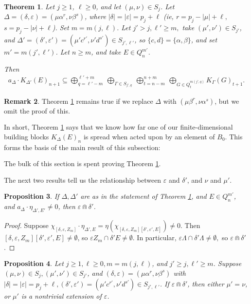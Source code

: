 \documentclass[12pt]{amsart}
\newcommand{\sse}{\subseteq}
\newcommand{\emp}{\emptyset}
\newcommand{\al}{\alpha}
\newcommand{\be}{\beta}
\newcommand{\de}{\delta}
\newcommand{\De}{\Delta}
\newcommand{\ep}{\varepsilon}
\newcommand{\La}{\Lambda}
\theoremstyle{plain} %
\newtheorem{Theorem}{Theorem}[section]
\newtheorem{Proposition}[Theorem]{Proposition}
\theoremstyle{definition} %
\newtheorem{Remark}[Theorem]{Remark}
\begin{document}
\begin{Theorem}\label{thm bandwidth}
    Let $j \ge 1$, $\ell \ge 0$, and let $(\mu, \nu) \in S_j$. Let $\De = (\de, \ep) = (\mu \al^r, \nu \be^s)$, where $|\de| = |\ep| = p_j + \ell$ (ie, $r = p_j - |\mu| + \ell,$ $s = p_j - |\nu| + \ell$). Set $m = m(j,\ell)$.
        Let $j' > j, \ell' \ge m,$ take $(\mu', \nu') \in S_{j'}$, and $\De' = (\de', \ep') = (\mu' c^{r'}, \nu' d^{s'}) \in S_{j', \ell'}$, so $\{c, d\} = \{\al, \be\}$, and set $m' = m(j', \ell')$. Let $n \ge m$, and take $E \in Q_n^{m'}$.

    Then
    \begin{align*}
        a_{\De} \cdot K_{\De'}(E)_{n+1} \sse \bigoplus_{q=\ell' - m}^{\ell'+m} \ \bigoplus_{\Gamma \in S_{j', q}} \ \bigoplus_{t=n-m}^{n+m} \ \bigoplus_{G \in Q_t^{m(j',q)}} K_{\Gamma}(G)_{t+1}.
    \end{align*}
\end{Theorem}

\begin{Remark}
    Theorem \ref{thm bandwidth} remains true if we replace $\De$ with $(\mu \be^r, \nu \al^s)$, but we omit the proof of this.
\end{Remark}

In short, Theorem \ref{thm bandwidth} says that we know how far one of our finite-dimensional building blocks $K_{\De}(E)_{n}$ is spread when acted upon by an element of $B_0$. This forms the basis of the main result of this subsection:


The bulk of this section is spent proving Theorem \ref{thm bandwidth}.



The next two results tell us the relationship between $\ep$ and $\de'$, and $\nu$ and $\mu'$. 


\begin{Proposition}\label{prop ep meets de'}
    If $\De, \De'$ are as in the statement of Theorem \ref{thm bandwidth}, and $E \in Q_n^{m'}$, and $a_{\De} \cdot \eta_{\De', E'} \neq 0$, then $\ep \Cap \de'$.
\end{Proposition}
\begin{proof}
    Suppose $\chi_{[\de, \ep, Z_m]} \cdot \eta_{\De', E} = \eta(\chi_{[\de, \ep, Z_m] [\de', \ep', E]}) \neq 0$. Then $[\de, \ep, Z_m]  [\de', \ep', E] \neq \emp$, so $\ep Z_m \cap \de' E \neq \emp$. In particular, $\ep \La \cap \de' \La \neq \emp,$ so $\ep \Cap \de'$.
\end{proof}

\begin{Proposition}\label{prop extension 2}
Let $j \geq 1, \ell \geq 0, m = m(j,\ell)$, and $j' \geq j, \ell' \geq m$. Suppose $(\mu, \nu) \in S_j, (\mu', \nu') \in S_{j'}$, and $(\de, \ep) = (\mu \al^r, \nu \be^s)$ with $|\de| = |\ep| = p_j + \ell, (\de', \ep') = (\mu'c^{r'}, \nu' d^{s'}) \in S_{j', \ell'}$.
    If $\ep \Cap \de'$, then either $\mu' = \nu$, or $\mu'$ is a nontrivial extension of $\ep$.
\end{Proposition}
\end{document}
